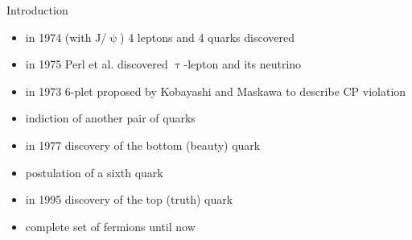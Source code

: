 \begin{frame}{Introduction}
	
	\begin{minipage}[c][.7\textheight]{.6\textwidth}
		\begin{itemize}
			\itemfill
			\item<1-> in 1974 (with J/$\uppsi$) 4 leptons and 4 quarks discovered
			\item<2-> in 1975 Perl et al. discovered $\uptau$-lepton and its neutrino
			\item<2-> in 1973 6-plet proposed by Kobayashi and Maskawa to describe CP violation
			\item<2-> indiction of another pair of quarks
			\item<3-> in 1977 discovery of the bottom (beauty) quark 
			\item<3-> postulation of a sixth quark
			\item<4-> in 1995 discovery of the top (truth) quark
			\item<4-> complete set of fermions until now
		\end{itemize}
	\end{minipage}
	\hfill
	\begin{minipage}{.37\textwidth}
	\end{minipage}


\end{frame}
